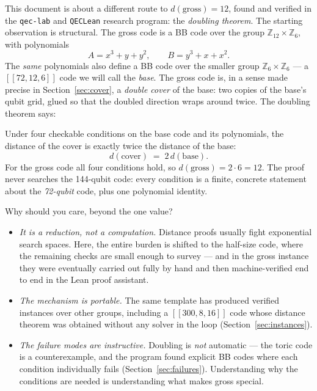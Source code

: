 \documentclass[11pt]{article}
\theoremstyle{plain}
\theoremstyle{definition}
\theoremstyle{remark}
\newcommand{\Z}{\mathbb{Z}}
\newcommand{\base}{\mathrm{base}}
\newcommand{\cov}{\mathrm{cover}}
\begin{document}
This document is about a different route to $d(\mathrm{gross}) = 12$, found
and verified in the \texttt{qec-lab} and \texttt{QECLean} research program:
the \emph{doubling theorem}. The starting observation is structural. The gross code
is a BB code over the group $\Z_{12}\times\Z_6$, with polynomials
\[
A = x^3 + y + y^2, \qquad B = y^3 + x + x^2 .
\]
The \emph{same} polynomials also define a BB code over the smaller group
$\Z_6\times\Z_6$ --- a $[[72,12,6]]$ code we will call the \emph{base}. The
gross code is, in a sense made precise in Section~\ref{sec:cover}, a
\emph{double cover} of the base: two copies of the base's qubit grid, glued so
that the doubled direction wraps around twice. The doubling theorem says:

\begin{keyidea}
Under four checkable conditions on the base code and its polynomials, the
distance of the cover is exactly twice the distance of the base:
\[
d(\cov) \;=\; 2\, d(\base).
\]
For the gross code all four conditions hold, so $d(\mathrm{gross}) = 2\cdot 6 =
12$. The proof never searches the 144-qubit code: every condition is a finite,
concrete statement about the \emph{72-qubit} code, plus one polynomial identity.
\end{keyidea}

Why should you care, beyond the one value?

\begin{itemize}[leftmargin=2em]
\item \emph{It is a reduction, not a computation.} Distance proofs usually
  fight exponential search spaces. Here, the entire burden is shifted to the
  half-size code, where the remaining checks are small enough to survey --- and
  in the gross instance they were eventually carried out fully by hand and then
  machine-verified end to end in the Lean proof assistant.
\item \emph{The mechanism is portable.} The same template has produced verified
  instances over other groups, including a $[[300,8,16]]$ code whose distance
  theorem was obtained without any solver in the loop
  (Section~\ref{sec:instances}).
\item \emph{The failure modes are instructive.} Doubling is \emph{not}
  automatic --- the toric code is a counterexample, and the program found
  explicit BB codes where each condition individually fails
  (Section~\ref{sec:failures}). Understanding why the conditions are needed is
  understanding what makes gross special.
\end{itemize}
\end{document}
